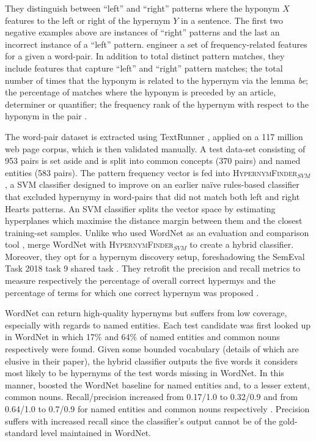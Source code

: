 They distinguish between “left” and “right” patterns where the hyponym $X$ features to the left or right of the hypernym $Y$ in a sentence.  The first two negative examples above are instances of “right” patterns and the last an incorrect instance of a “left” pattern.  \citeauthor{ritter2009anyway} engineer a set of frequency-related features for a given a word-pair.  In addition to total distinct pattern matches, they include features that capture “left” and “right” pattern matches; the total number of times that the hyponym is related to the hypernym via the lemma \textit{be}; the percentage of matches where the hyponym is preceded by an article, determiner or quantifier; the frequency rank of the hypernym with respect to the hyponym in the pair \citep{ritter2009anyway}.   

The word-pair dataset is extracted using TextRunner \citep{banko2007open}, applied on a 117 million web page corpus, which is then validated manually.  A test data-set consisting of 953 pairs is set aside and is split into common concepts (370 pairs) and named entities (583 pairs).  The pattern frequency vector is fed into \textsc{HypernymFinder$_{SVM}$}, a \ac{SVM} classifier \citep{platt1999probabilistic} designed to improve on an earlier na\"ive rules-based classifier that excluded hypernymy in word-pairs that did not match both left and right Hearts patterns.  An \ac{SVM} classifier splits the vector space by estimating hyperplanes which maximise the distance margin between them and the closest training-set samples.    
Unlike \citeauthor{Snow2004} who used WordNet as an evaluation and comparison tool \citep{Snow2004}, \citeauthor{ritter2009anyway} merge WordNet with \textsc{HypernymFinder$_{SVM}$} to create a hybrid classifier.  
Moreover, they opt for a hypernym discovery setup, foreshadowing the SemEval Task 2018 task 9 shared task \citep{camacho2018semeval}.  They retrofit the precision and recall metrics to measure respectively the percentage of overall correct hypermys and the percentage of terms for which one correct hypernym was proposed \citep{ritter2009anyway}.  

WordNet can return high-quality hypernyms but suffers from low coverage, especially with regards to named entities.  Each test candidate was first looked up in WordNet in which 17\% and 64\% of named entities and common nouns respectively were found.  Given some bounded vocabulary (details of which are elusive in their paper), the hybrid classifier outputs the five words it considers most likely to be hypernyms of the test words missing in WordNet.  In this manner, \citeauthor{ritter2009anyway} boosted the WordNet baseline for named entities and, to a lesser extent, common nouns.  Recall/precision increased from 0.17/1.0 to 0.32/0.9 and from 0.64/1.0 to 0.7/0.9 for named entities and common nouns respectively \citep{ritter2009anyway}.  Precision suffers with increased recall since the classifier’s output cannot be of the gold-standard level maintained in WordNet.

